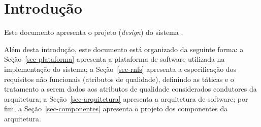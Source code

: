\chapter{Introdução}
\label{sec-intro}
\vspace{-1cm}

Este documento apresenta o projeto (\textit{design}) do sistema \emph{\imprimirtitulo}. 


Além desta introdução, este documento está organizado da seguinte forma: 
	a Seção~\ref{sec-plataforma} apresenta a plataforma de software utilizada na implementação do sistema;
	a Seção~\ref{sec-rnfs} apresenta a especificação dos requisitos não funcionais (atributos de qualidade), definindo as táticas e o tratamento a serem dados aos atributos de qualidade considerados condutores da arquitetura; 
	a Seção~\ref{sec-arquitetura} apresenta a arquitetura de software; por fim, 
	a Seção~\ref{sec-componentes} apresenta o projeto dos componentes da arquitetura.

